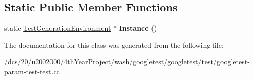\subsection*{Static Public Member Functions}
\begin{DoxyCompactItemize}
\item 
\mbox{\label{classTestGenerationEnvironment_a5b8e14f430fe11d558c0e4482cebd694}} 
static \mbox{\hyperlink{classTestGenerationEnvironment}{Test\+Generation\+Environment}} $\ast$ {\bfseries Instance} ()
\end{DoxyCompactItemize}


The documentation for this class was generated from the following file\+:\begin{DoxyCompactItemize}
\item 
/dcs/20/u2002000/4th\+Year\+Project/wash/googletest/googletest/test/googletest-\/param-\/test-\/test.\+cc\end{DoxyCompactItemize}
